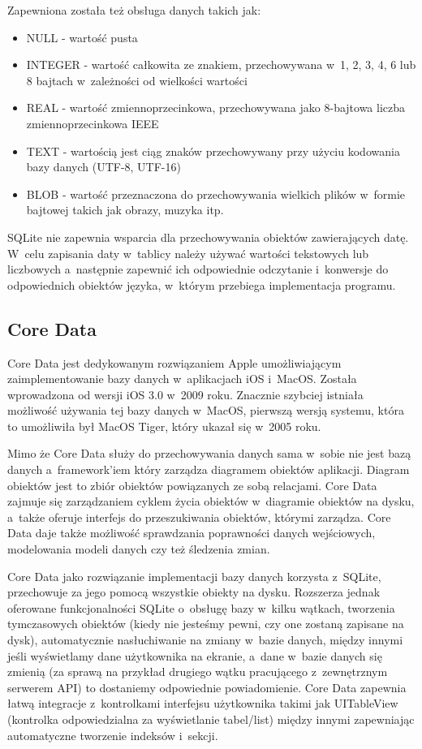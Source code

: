 Zapewniona została też obsługa danych takich jak: 

\begin{itemize}
	\item NULL - wartość pusta
	\item INTEGER - wartość całkowita ze znakiem, przechowywana w~1, 2, 3, 4, 6 lub 8 bajtach w~zależności od wielkości wartości
	\item REAL - wartość zmiennoprzecinkowa, przechowywana jako 8-bajtowa liczba zmiennoprzecinkowa IEEE
	\item TEXT - wartością jest ciąg znaków przechowywany przy użyciu kodowania bazy danych (UTF-8, UTF-16)
	\item BLOB - wartość przeznaczona do przechowywania wielkich plików w~formie bajtowej takich jak obrazy, muzyka itp. 
\end{itemize}

SQLite nie zapewnia wsparcia dla przechowywania obiektów zawierających datę. W~celu zapisania daty w~tablicy należy używać wartości tekstowych lub liczbowych a~następnie zapewnić ich odpowiednie odczytanie i~konwersje do odpowiednich obiektów języka, w~którym przebiega implementacja programu. 

\subsection{Core Data}

Core Data jest dedykowanym rozwiązaniem Apple umożliwiającym zaimplementowanie bazy danych w~aplikacjach iOS i~MacOS. Została wprowadzona od wersji iOS 3.0 w~2009 roku. Znacznie szybciej istniała możliwość używania tej bazy danych w~MacOS,  pierwszą wersją systemu, która to umożliwiła był MacOS Tiger, który ukazał się w~2005 roku.\par

Mimo że Core Data służy do przechowywania danych sama w~sobie nie jest bazą danych a~framework'iem który zarządza diagramem obiektów aplikacji. Diagram obiektów jest to zbiór obiektów powiązanych ze sobą relacjami. Core Data zajmuje się zarządzaniem cyklem życia obiektów w~diagramie obiektów na dysku, a~także oferuje interfejs do przeszukiwania obiektów, którymi zarządza. Core Data daje także możliwość sprawdzania poprawności danych wejściowych, modelowania modeli danych czy też śledzenia zmian. \par

Core Data jako rozwiązanie implementacji bazy danych korzysta z~SQLite, przechowuje za jego pomocą wszystkie obiekty na dysku. Rozszerza jednak oferowane funkcjonalności SQLite o~obsługę bazy w~kilku wątkach, tworzenia tymczasowych obiektów (kiedy nie jesteśmy pewni, czy one zostaną zapisane na dysk), automatycznie nasłuchiwanie na zmiany w~bazie danych, między innymi jeśli wyświetlamy dane użytkownika na ekranie, a~dane w~bazie danych się zmienią (za sprawą na przykład drugiego wątku pracującego z~zewnętrznym serwerem API) to dostaniemy odpowiednie powiadomienie. Core Data zapewnia łatwą integracje z~kontrolkami interfejsu użytkownika takimi jak UITableView (kontrolka odpowiedzialna za wyświetlanie tabel/list) między innymi zapewniając automatyczne tworzenie indeksów i~sekcji.\par

